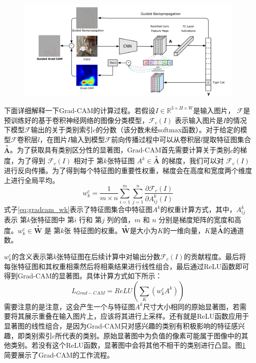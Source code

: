\begin{figure}[h]
	\centering 
	\includegraphics[width=15cm]{fig/ch2/gradcam1.png}
	\label{fig:gradcam1}
\end{figure}

下面详细解释一下Grad-CAM的计算过程。若假设$I \in \mathbb{R}^{3\times H \times W}$是输入图片， $\mathcal{F}$是预训练好的基于卷积神经网络的图像分类模型，$\mathcal{F}_c(I)$ 表示输入图片是$I$的情况下模型$\mathcal{F}$输出的关于类别索引$c$的分数（该分数未经softmax函数）。对于给定的模型$\mathcal{F}$卷积层$l$，在图片$I$输入到模型$\mathcal{F}$前向传播过程中可以从卷积层$l$提取特征图集合$\overset{*}{\bm{A}}$。为了获取具有类别区分性的显著图，Grad-CAM首先需要计算关于类别$c$的梯度，为了得到 $\mathcal{F}_c(I)$ 相对于 第$k$张特征图 $A^k \in \overset{*}{\bm{A}}$ 的梯度，我们可以对 $\mathcal{F}_c(I)$ 进行反向传播。为了得到每个特征图的重要性权重，梯度会在高度和宽度两个维度上进行全局平均。
\begin{equation}
	w^c_k=\frac{1}{m\times n}\sum_{i=1}^{m}\sum_{j=1}^{n}\frac{\partial \mathcal{F}_c(I)}{\partial A_{ij}^k(I)}
	\label{eq:gradcam_wk}
\end{equation}
式子\ref{eq:gradcam_wk}表示了特征图集合中特征图$A^k$的权重计算方式，其中，$A_{ij}^k$ 表示 第$k$张特征图中 第$i$ 行和 第$j$ 列的值，$m$ 和 $n$ 分别是梯度矩阵的宽度和高度。$w^c_k \in \overset{*}{\bm{W}}$ 是 第$k$张 特征图的权重。$\overset{*}{\bm{W}}$是大小为$K$的一维向量，$K$是$\overset{*}{\bm{A}}$的通道数。


$w^c_k $的含义表示第$k$张特征图在后续计算中对输出分数$\mathcal{F}_c(I)$的贡献程度。最后将每张特征图和其权重相乘然后将相乘结果进行线性组合，最后通过ReLU函数即可得到Grad-CAM的显著图。具体计算方式如下所示：
\begin{equation}
	L_{Grad-CAM}=ReLU(\sum_K(w^c_k A^k))
	\label{eq:gradcam}
\end{equation}
需要注意的是注意，这会产生一个与特征图$A^k$尺寸大小相同的原始显著图，若需要将其展示重叠在输入图片上，应该将其进行上采样。还有就是ReLU函数应用于显著图的线性组合，是因为Grad-CAM只对感兴趣的类别有积极影响的特征感兴趣，即类别索引$c$所代表的类别。原始显著图中为负值的像素可能属于图像中的其他类别。若没有这个ReLU函数，显著图中会将其他不相干的类别进行凸显。图\ref{fig:gradcam1}简要展示了Grad-CAM的工作流程。


